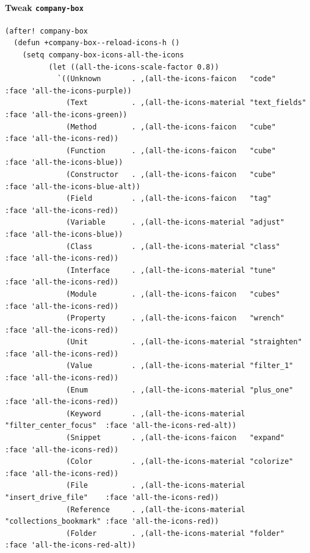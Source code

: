 \documentclass[11pt]{article}
\begin{document}
\paragraph{Tweak \texttt{company-box}}
\label{sec:org9541a00}

\begin{verbatim}
(after! company-box
  (defun +company-box--reload-icons-h ()
    (setq company-box-icons-all-the-icons
          (let ((all-the-icons-scale-factor 0.8))
            `((Unknown       . ,(all-the-icons-faicon   "code"                 :face 'all-the-icons-purple))
              (Text          . ,(all-the-icons-material "text_fields"          :face 'all-the-icons-green))
              (Method        . ,(all-the-icons-faicon   "cube"                 :face 'all-the-icons-red))
              (Function      . ,(all-the-icons-faicon   "cube"                 :face 'all-the-icons-blue))
              (Constructor   . ,(all-the-icons-faicon   "cube"                 :face 'all-the-icons-blue-alt))
              (Field         . ,(all-the-icons-faicon   "tag"                  :face 'all-the-icons-red))
              (Variable      . ,(all-the-icons-material "adjust"               :face 'all-the-icons-blue))
              (Class         . ,(all-the-icons-material "class"                :face 'all-the-icons-red))
              (Interface     . ,(all-the-icons-material "tune"                 :face 'all-the-icons-red))
              (Module        . ,(all-the-icons-faicon   "cubes"                :face 'all-the-icons-red))
              (Property      . ,(all-the-icons-faicon   "wrench"               :face 'all-the-icons-red))
              (Unit          . ,(all-the-icons-material "straighten"           :face 'all-the-icons-red))
              (Value         . ,(all-the-icons-material "filter_1"             :face 'all-the-icons-red))
              (Enum          . ,(all-the-icons-material "plus_one"             :face 'all-the-icons-red))
              (Keyword       . ,(all-the-icons-material "filter_center_focus"  :face 'all-the-icons-red-alt))
              (Snippet       . ,(all-the-icons-faicon   "expand"               :face 'all-the-icons-red))
              (Color         . ,(all-the-icons-material "colorize"             :face 'all-the-icons-red))
              (File          . ,(all-the-icons-material "insert_drive_file"    :face 'all-the-icons-red))
              (Reference     . ,(all-the-icons-material "collections_bookmark" :face 'all-the-icons-red))
              (Folder        . ,(all-the-icons-material "folder"               :face 'all-the-icons-red-alt))

\end{verbatim}
\end{document}
